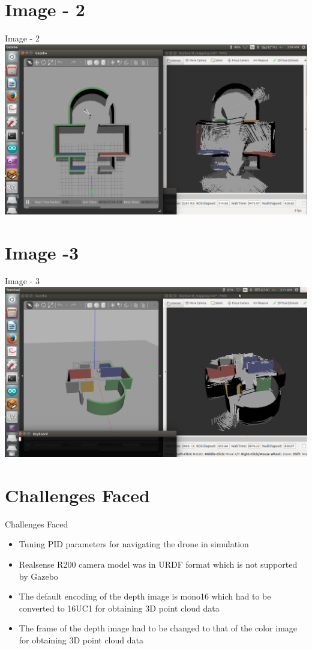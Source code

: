 \documentclass[10pt, a4paper]{beamer}
\begin{document}
\section{Image - 2}
\begin{frame}{Image  - 2}
\includegraphics[scale = 0.2]{2.png}
\end{frame}

\section{Image -3}
\begin{frame}{Image - 3}
\includegraphics[scale = 0.2]{3.png}
\end{frame}

\section{Challenges Faced}
\begin{frame}{Challenges Faced}
	\begin{itemize}
		\item Tuning PID parameters for navigating the drone in simulation
		\item Realsense R200 camera model was in URDF format which is not supported by Gazebo
		\item The default encoding of the depth image is mono16 which had to be converted to 16UC1 for obtaining 3D point cloud data
		\item The frame of the depth image had to be changed to that of the color image for obtaining 3D point cloud data
	\end{itemize}
\end{frame}
\end{document}
